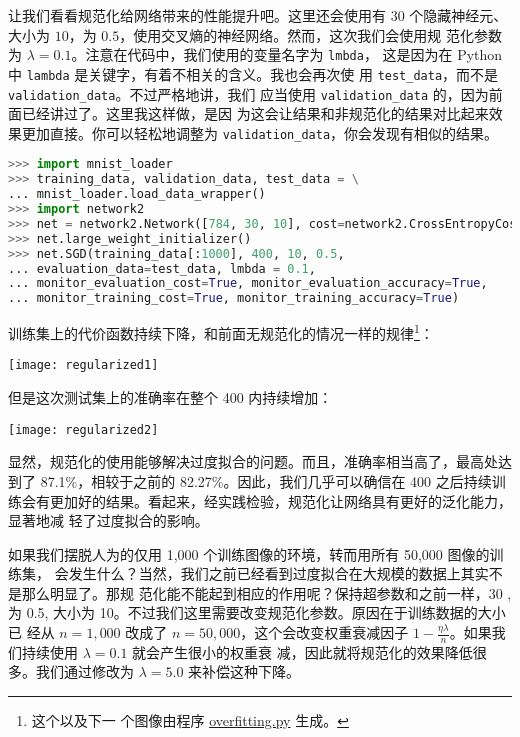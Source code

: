 让我们看看规范化给网络带来的性能提升吧。这里还会使用有 $30$ 个隐藏神经元、\minibatch{}
大小为 $10$，\learningrate{}为 $0.5$，使用交叉熵的神经网络。然而，这次我们会使用规
范化参数为 $\lambda = 0.1$。注意在代码中，我们使用的变量名字为 \lstinline!lmbda!，
这是因为在 Python 中 \lstinline!lambda! 是关键字，有着不相关的含义。我也会再次使
用 \lstinline!test_data!，而不是 \lstinline!validation_data!。不过严格地讲，我们
应当使用 \lstinline!validation_data! 的，因为前面已经讲过了。这里我这样做，是因
为这会让结果和非规范化的结果对比起来效果更加直接。你可以轻松地调整为
\lstinline!validation_data!，你会发现有相似的结果。

\begin{lstlisting}[language=Python]
>>> import mnist_loader
>>> training_data, validation_data, test_data = \
... mnist_loader.load_data_wrapper()
>>> import network2
>>> net = network2.Network([784, 30, 10], cost=network2.CrossEntropyCost)
>>> net.large_weight_initializer()
>>> net.SGD(training_data[:1000], 400, 10, 0.5,
... evaluation_data=test_data, lmbda = 0.1,
... monitor_evaluation_cost=True, monitor_evaluation_accuracy=True,
... monitor_training_cost=True, monitor_training_accuracy=True)
\end{lstlisting}

训练集上的代价函数持续下降，和前面无规范化的情况一样的规律\footnote{这个以及下一
  个图像由程序
  \href{https://github.com/mnielsen/neural-networks-and-deep-learning/blob/master/fig/overfitting.py}{overfitting.py}
  生成。}：
\begin{center}
  \texttt{[image: regularized1]}
\end{center}

但是这次测试集上的准确率在整个 400 \epochs{}内持续增加：
\begin{center}
  \texttt{[image: regularized2]}
\end{center}

显然，规范化的使用能够解决过度拟合的问题。而且，准确率相当高了，最高处达到了
87.1\%，相较于之前的 82.27\%。因此，我们几乎可以确信在 400 \epochs{}之后持续训
练会有更加好的结果。看起来，经实践检验，规范化让网络具有更好的泛化能力，显著地减
轻了过度拟合的影响。

如果我们摆脱人为的仅用 1,000 个训练图像的环境，转而用所有 50,000 图像的训练集，
会发生什么？当然，我们之前已经看到过度拟合在大规模的数据上其实不是那么明显了。那规
范化能不能起到相应的作用呢？保持超参数和之前一样，30 \epochs{}, \learningrate{}为 0.5,
\minibatch{}大小为 10。不过我们这里需要改变规范化参数。原因在于训练数据的大小已
经从 $n=1,000$ 改成了 $n=50,000$，这个会改变权重衰减因子
$1-\frac{\eta\lambda}{n}$。如果我们持续使用 $\lambda = 0.1$ 就会产生很小的权重衰
减，因此就将规范化的效果降低很多。我们通过修改为 $\lambda = 5.0$ 来补偿这种下降。

